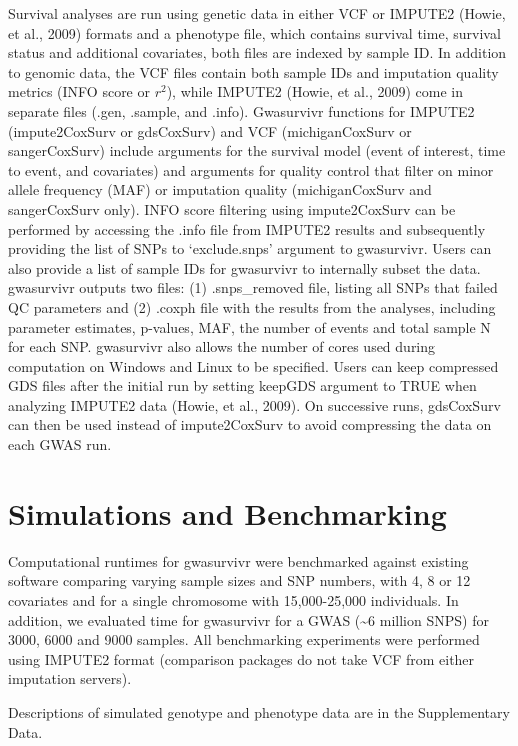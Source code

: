 \documentclass[]{DissertateUSU}
\begin{document}
Survival analyses are run using genetic data in either VCF or IMPUTE2
(Howie, et al., 2009) formats and a phenotype file, which contains
survival time, survival status and additional covariates, both files are
indexed by sample ID. In addition to genomic data, the VCF files contain
both sample IDs and imputation quality metrics (INFO score or \(r^2\)),
while IMPUTE2 (Howie, et al., 2009) come in separate files (.gen,
.sample, and .info). Gwasurvivr functions for IMPUTE2 (impute2CoxSurv or
gdsCoxSurv) and VCF (michiganCoxSurv or sangerCoxSurv) include arguments
for the survival model (event of interest, time to event, and
covariates) and arguments for quality control that filter on minor
allele frequency (MAF) or imputation quality (michiganCoxSurv and
sangerCoxSurv only). INFO score filtering using impute2CoxSurv can be
performed by accessing the .info file from IMPUTE2 results and
subsequently providing the list of SNPs to `exclude.snps' argument to
gwasurvivr. Users can also provide a list of sample IDs for gwasurvivr
to internally subset the data. gwasurvivr outputs two files: (1)
.snps\_removed file, listing all SNPs that failed QC parameters and (2)
.coxph file with the results from the analyses, including parameter
estimates, p-values, MAF, the number of events and total sample N for
each SNP. gwasurvivr also allows the number of cores used during
computation on Windows and Linux to be specified. Users can keep
compressed GDS files after the initial run by setting keepGDS argument
to TRUE when analyzing IMPUTE2 data (Howie, et al., 2009). On successive
runs, gdsCoxSurv can then be used instead of impute2CoxSurv to avoid
compressing the data on each GWAS run.

\section{Simulations and
Benchmarking}\label{simulations-and-benchmarking}

Computational runtimes for gwasurvivr were benchmarked against existing
software comparing varying sample sizes and SNP numbers, with 4, 8 or 12
covariates and for a single chromosome with 15,000-25,000 individuals.
In addition, we evaluated time for gwasurvivr for a GWAS
(\textasciitilde{}6 million SNPS) for 3000, 6000 and 9000 samples. All
benchmarking experiments were performed using IMPUTE2 format (comparison
packages do not take VCF from either imputation servers).

Descriptions of simulated genotype and phenotype data are in the
Supplementary Data.
\end{document}
